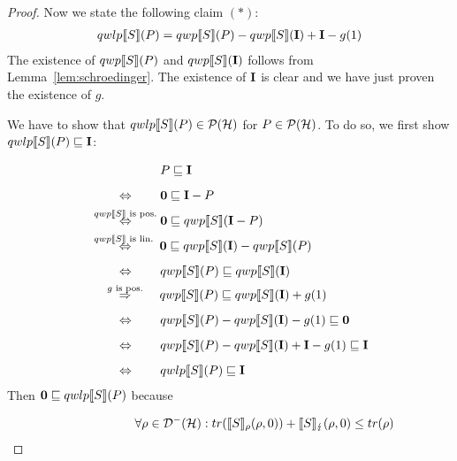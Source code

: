 \documentclass[a4paper,UKenglish,cleveref, autoref, thm-restate]{lipics-v2021}
\begin{document}
\begin{proof}
    Now we state the following claim $(*)$:
    \begin{align*}
        qwlp\llbracket S \rrbracket (P) = qwp\llbracket S \rrbracket (P) - qwp\llbracket S \rrbracket (\textbf{I}) + \textbf{I} - g(1)
    \end{align*}
    The existence of $qwp\llbracket S \rrbracket (P)$ and $qwp\llbracket S \rrbracket (\textbf{I})$ follows from Lemma~\ref{lem:schroedinger}. The existence of $\textbf{I}$ is clear and we have just proven the existence of $g$.

    We have to show that $qwlp\llbracket S \rrbracket (P) \in \mathcal{P}(\mathcal{H})$ for $P\in \mathcal{P}(\mathcal{H})$. To do so, we first show $qwlp\llbracket S \rrbracket (P)\sqsubseteq \textbf{I}$:
    \begin{align*}
         &\phantom{\overset{qwp\llbracket S \rrbracket \text{ is pos.}}{\Leftrightarrow}.}P \sqsubseteq  \identityOp \\
        &\overset{\phantom{qwp\llbracket S \rrbracket \text{ is pos.}}}{\Leftrightarrow} \zeroOp \sqsubseteq  \identityOp-P \\
        &\overset{qwp\llbracket S \rrbracket \text{ is pos.}}{\Leftrightarrow} \zeroOp \sqsubseteq  \qwp{S}{\identityOp-P} \\
        &\overset{qwp\llbracket S \rrbracket \text{ is lin.}\phantom{.}}{\Leftrightarrow} \zeroOp \sqsubseteq  \qwp{S}{\identityOp} -\qwp{S}{P} \\
        &\overset{\phantom{qwp\llbracket S \rrbracket \text{ is pos.}}}{\Leftrightarrow} \qwp{S}{P} \sqsubseteq  \qwp{S}{\identityOp} \\
        &\overset{\phantom{xs.}g \text{ is pos.}\phantom{xs.}}{\Rightarrow} \qwp{S}{P} \sqsubseteq  \qwp{S}{\identityOp} + g(1)\\
        &\overset{\phantom{qwp\llbracket S \rrbracket \text{ is pos.}}}{\Leftrightarrow} \qwp{S}{P} - \qwp{S}{\identityOp} - g(1) \sqsubseteq \zeroOp\\
        &\overset{\phantom{qwp\llbracket S \rrbracket \text{ is pos.}}}{\Leftrightarrow} \qwp{S}{P} - \qwp{S}{\identityOp} + \identityOp - g(1)\sqsubseteq \identityOp\\
        &\overset{\phantom{qwp\llbracket S \rrbracket \text{ is pos.}}}{\Leftrightarrow}\qwlp{S}{P} \sqsubseteq \identityOp
    \end{align*}
    Then $\mathbf{0}\sqsubseteq qwlp\llbracket S \rrbracket (P)$ because
    \begin{align*}
        &\phantom{\overset{qwp\llbracket S \rrbracket\text{ is pos.}}{\Rightarrow} .} \forall \rho \in \density: tr(\semanticsRho{S}(\rho,0)) + \semanticsErr{S}(\rho,0) \leq tr(\rho)\\

\end{align*}
\end{proof}
\end{document}
